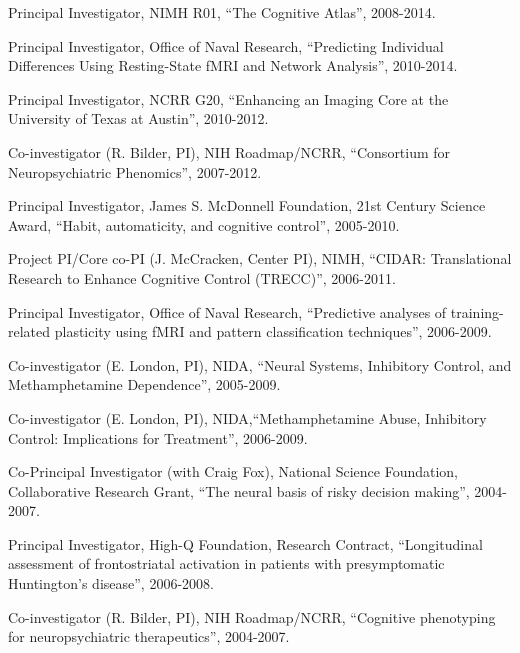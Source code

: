 \documentclass[10pt, letterpaper]{article}
\begin{document}
Principal Investigator, NIMH R01, ``The Cognitive Atlas'', 2008-2014.\vspace{2mm}

Principal Investigator, Office of Naval Research, ``Predicting Individual Differences Using Resting-State fMRI and Network Analysis'', 2010-2014.\vspace{2mm}

Principal Investigator, NCRR G20, ``Enhancing an Imaging Core at the University of Texas at Austin'', 2010-2012. \vspace{2mm}

Co-investigator (R. Bilder, PI), NIH Roadmap/NCRR, ``Consortium for Neuropsychiatric Phenomics'', 2007-2012.\vspace{2mm}

Principal Investigator, James S. McDonnell Foundation, 21st Century Science Award, ``Habit, automaticity, and cognitive control'', 2005-2010.\vspace{2mm}

Project PI/Core co-PI (J. McCracken, Center PI), NIMH, ``CIDAR: Translational Research to Enhance Cognitive Control (TRECC)'', 2006-2011.\vspace{2mm}

Principal Investigator, Office of Naval Research, ``Predictive analyses of training-related plasticity using fMRI and pattern classification techniques'', 2006-2009.\vspace{2mm}

Co-investigator (E. London, PI), NIDA, ``Neural Systems, Inhibitory Control, and Methamphetamine Dependence'', 2005-2009.\vspace{2mm}

Co-investigator (E. London, PI), NIDA,``Methamphetamine Abuse, Inhibitory Control: Implications for Treatment'', 2006-2009.\vspace{2mm}

Co-Principal Investigator (with Craig Fox), National Science Foundation, Collaborative Research Grant, ``The neural basis of risky decision making'', 2004-2007.\vspace{2mm}

Principal Investigator, High-Q Foundation, Research Contract, ``Longitudinal assessment of frontostriatal activation in patients with presymptomatic Huntington's disease'', 2006-2008.\vspace{2mm}

Co-investigator (R. Bilder, PI), NIH Roadmap/NCRR, ``Cognitive phenotyping for neuropsychiatric therapeutics'', 2004-2007.\vspace{2mm}
\end{document}
